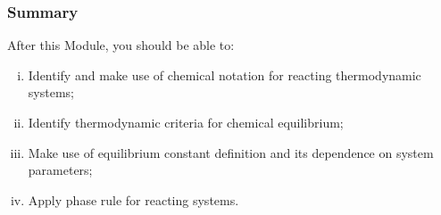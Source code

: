 \documentclass[10pt,compress,unknownkeysallowed]{beamer}
\begin{document}
\begin{frame}
 \frametitle{Summary}
   After this Module, you should be able to:
   \begin{enumerate}[(i)]
     \item Identify and make use of chemical notation for reacting thermodynamic systems;
     \item Identify thermodynamic criteria for chemical equilibrium;
     \item Make use of equilibrium constant definition and its dependence on system parameters;
     \item Apply phase rule for reacting systems.
   \end{enumerate}
\end{frame}
\end{document}
